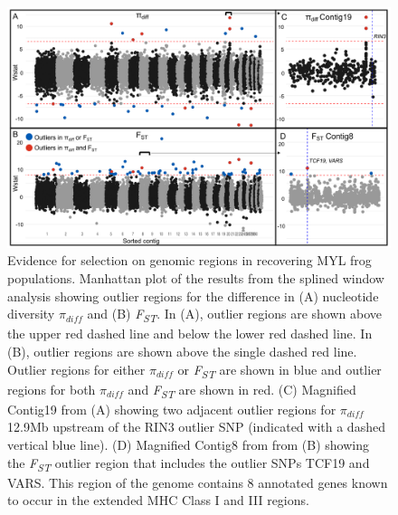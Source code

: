 \documentclass[9pt,twocolumn,twoside,lineno]{pnas-new}
\begin{document}
\begin{figure}

{\centering \includegraphics[width=\textwidth]{figures/splinewindow_manhattan.png}

}

\caption{\label{fig-spline-manhattan}Evidence for selection on genomic
regions in recovering MYL frog populations. Manhattan plot of the
results from the splined window analysis showing outlier regions for the
difference in (A) nucleotide diversity \(\pi_{diff}\) and (B)
\emph{F\textsubscript{ST}}. In (A), outlier regions are shown above the
upper red dashed line and below the lower red dashed line. In (B),
outlier regions are shown above the single dashed red line. Outlier
regions for either \(\pi_{diff}\) or \emph{F\textsubscript{ST}} are
shown in blue and outlier regions for both \(\pi_{diff}\) and
\emph{F\textsubscript{ST}} are shown in red. (C) Magnified Contig19 from
(A) showing two adjacent outlier regions for \(\pi_{diff}\) 12.9Mb
upstream of the RIN3 outlier SNP (indicated with a dashed vertical blue
line). (D) Magnified Contig8 from from (B) showing the
\emph{F\textsubscript{ST}} outlier region that includes the outlier SNPs
TCF19 and VARS. This region of the genome contains 8 annotated genes
known to occur in the extended MHC Class I and III regions.}

\end{figure}

\newpage
\end{document}
